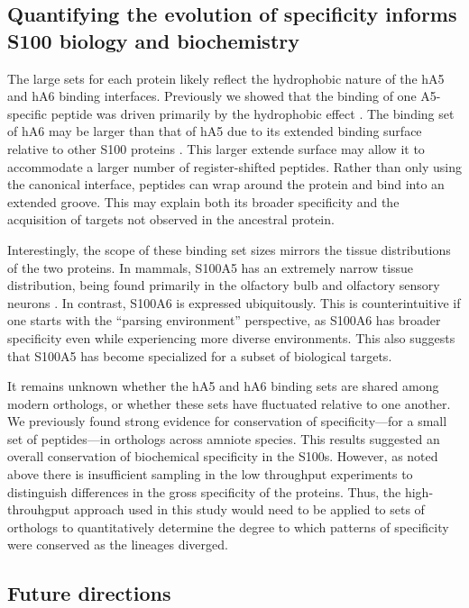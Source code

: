 \subsection{Quantifying the evolution of specificity informs S100 biology and
biochemistry}

The large sets for each protein likely reflect the hydrophobic nature
of the hA5 and hA6 binding interfaces. Previously we showed that the
binding of one A5-specific peptide was driven primarily by the hydrophobic
effect \citep{wheeler_conservation_2017}. The binding set of hA6
may be larger than that of hA5 due to its extended binding surface
relative to other S100 proteins \citep{lee_structure_2008}. This
larger extende surface may allow it to accommodate a larger number
of register-shifted peptides. Rather than only using the canonical
interface, peptides can wrap around the protein and bind into an extended
groove. This may explain both its broader specificity and the acquisition
of targets not observed in the ancestral protein. 

Interestingly, the scope of these binding set sizes mirrors the tissue
distributions of the two proteins. In mammals, S100A5 has an extremely
narrow tissue distribution, being found primarily in the olfactory
bulb and olfactory sensory neurons \citep{knott_olfactory_2012,mcintyre_gene_2012,olender_human_2016}.
In contrast, S100A6 is expressed ubiquitously. This is counterintuitive
if one starts with the ``parsing environment'' perspective, as S100A6
has broader specificity even while experiencing more diverse environments.
This also suggests that S100A5 has become specialized for a subset
of biological targets. 

It remains unknown whether the hA5 and hA6 binding sets are shared
among modern orthologs, or whether these sets have fluctuated relative
to one another. We previously found strong evidence for conservation
of specificity---for a small set of peptides---in orthologs across amniote
species. This results suggested an overall conservation of biochemical
specificity in the S100s. However, as noted above there is insufficient
sampling in the low throughput experiments to distinguish differences
in the gross specificity of the proteins. Thus, the high-throuhgput
approach used in this study would need to be applied to sets of orthologs
to quantitatively determine the degree to which patterns of specificity
were conserved as the lineages diverged. 

\subsection{Future directions}

